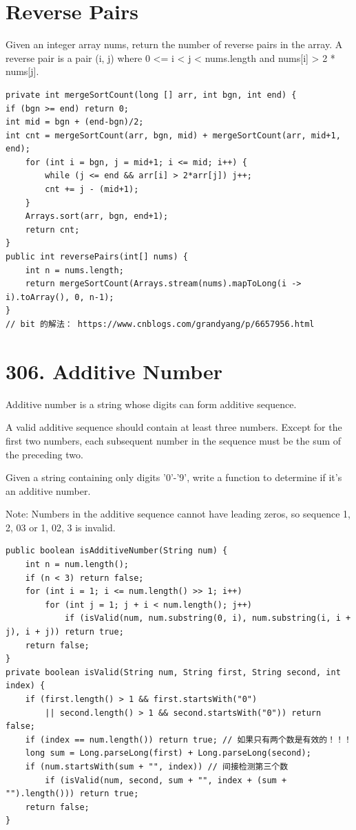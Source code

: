 \documentclass[9pt, b5paaper]{book}
\begin{document}
\section{Reverse Pairs}
\label{sec-14-3}
Given an integer array nums, return the number of reverse pairs in the array.
A reverse pair is a pair (i, j) where 0 <= i < j < nums.length and nums[i] > 2 * nums[j].
\begin{verbatim}
private int mergeSortCount(long [] arr, int bgn, int end) {
if (bgn >= end) return 0;
int mid = bgn + (end-bgn)/2;
int cnt = mergeSortCount(arr, bgn, mid) + mergeSortCount(arr, mid+1, end);
    for (int i = bgn, j = mid+1; i <= mid; i++) {
        while (j <= end && arr[i] > 2*arr[j]) j++;
        cnt += j - (mid+1);
    }
    Arrays.sort(arr, bgn, end+1);
    return cnt;
}
public int reversePairs(int[] nums) {
    int n = nums.length;
    return mergeSortCount(Arrays.stream(nums).mapToLong(i -> i).toArray(), 0, n-1);
}
// bit 的解法： https://www.cnblogs.com/grandyang/p/6657956.html
\end{verbatim}

\section{306. Additive Number}
\label{sec-14-4}
Additive number is a string whose digits can form additive sequence.

A valid additive sequence should contain at least three numbers. Except for the first two numbers, each subsequent number in the sequence must be the sum of the preceding two.

Given a string containing only digits '0'-'9', write a function to determine if it's an additive number.

Note: Numbers in the additive sequence cannot have leading zeros, so sequence 1, 2, 03 or 1, 02, 3 is invalid.
\begin{verbatim}
public boolean isAdditiveNumber(String num) {
    int n = num.length();
    if (n < 3) return false;
    for (int i = 1; i <= num.length() >> 1; i++)
        for (int j = 1; j + i < num.length(); j++)  
            if (isValid(num, num.substring(0, i), num.substring(i, i + j), i + j)) return true;
    return false;
}
private boolean isValid(String num, String first, String second, int index) {
    if (first.length() > 1 && first.startsWith("0") 
        || second.length() > 1 && second.startsWith("0")) return false;
    if (index == num.length()) return true; // 如果只有两个数是有效的！！！
    long sum = Long.parseLong(first) + Long.parseLong(second);
    if (num.startsWith(sum + "", index)) // 间接检测第三个数
        if (isValid(num, second, sum + "", index + (sum + "").length())) return true;
    return false;
}
\end{verbatim}
\end{document}
